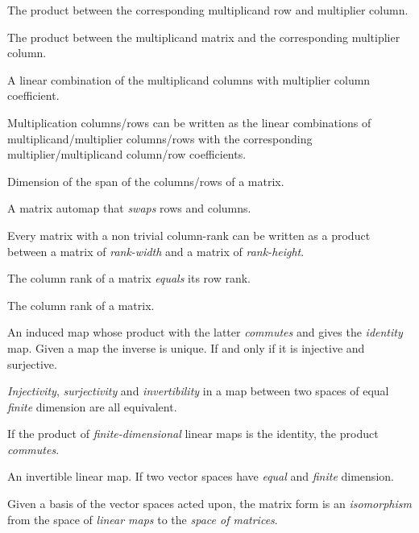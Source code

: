 \begin{multicols}{3}
  The product between the corresponding multiplicand row and multiplier column.

  The product between the multiplicand matrix and the corresponding multiplier column.

  A linear combination of the multiplicand columns with multiplier column coefficient.

  Multiplication columns/rows can be written as the linear combinations of
  multiplicand/multiplier columns/rows with
  the corresponding multiplier/multiplicand column/row coefficients.
  
  Dimension of the span of the columns/rows of a matrix.

  A matrix automap that \textit{swaps} rows and columns.

  Every matrix with a non trivial column-rank
  can be written as a product between
  a matrix of \textit{rank-width} and a matrix of \textit{rank-height}.

  The column rank of a matrix \textit{equals} its row rank.

  The column rank of a matrix.

  An induced map whose product with the latter \textit{commutes} and gives the \textit{identity} map.
  Given a map the inverse is unique.
  If and only if it is injective and surjective.

  \textit{Injectivity}, \textit{surjectivity} and \textit{invertibility} in a map between two spaces of equal \textit{finite} dimension are all equivalent.

  If the product of \textit{finite-dimensional} linear maps is the identity, the product \textit{commutes}.

  An invertible linear map.
  If two vector spaces have \textit{equal} and \textit{finite} dimension.

  Given a basis of the vector spaces acted upon, the matrix form is an
  \textit{isomorphism} from the space of \textit{linear maps} to the \textit{space of matrices}.


\end{multicols}

